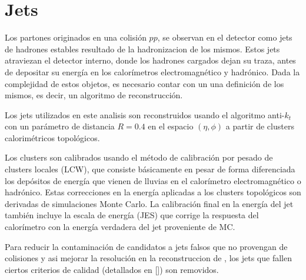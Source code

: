 \section{Jets}
\label{sec:jet_obj}

Los partones originados en una colisión $pp$, se observan en el detector como
jets de hadrones estables resultado de la hadronizacion de los mismos. Estos
jets atraviezan el detector interno, donde los hadrones cargados dejan su
traza, antes de depositar su energía en los calorímetros electromagnético y
hadrónico. Dada la complejidad de estos objetos, es necesario contar con un una
definición de los mismos, es decir, un algoritmo de reconstrucción.

Los jets utilizados en este analisis son reconstruidos usando el algoritmo
anti-$k_t$\cite{Cacciari:2008gp} con un parámetro de distancia $R = 0.4$ en el
espacio $(\eta, \phi)$ a partir de clusters calorimétricos
topológicos\cite{Lampl:1099735}.


Los clusters son calibrados usando el método de calibración por pesado de
clusters locales (LCW), que consiste básicamente en pesar de forma diferenciada
los depósitos de energía que vienen de lluvias en el calorímetro
electromagnético o hadrónico. Estas correcciones en la energía aplicadas a los
clusters topológicos son derivadas de simulaciones Monte Carlo. La calibración
final en la energía del jet también incluye la escala de energía (JES) que
corrige la respuesta del calorímetro con la energía verdadera del jet
proveniente de MC. %


Para reducir la contaminación de candidatos a jets falsos que no provengan de colisiones y asi
mejorar la resolución en la reconstruccion de {\met}, los jets que fallen
ciertos criterios de calidad (detallados en []) son removidos.


